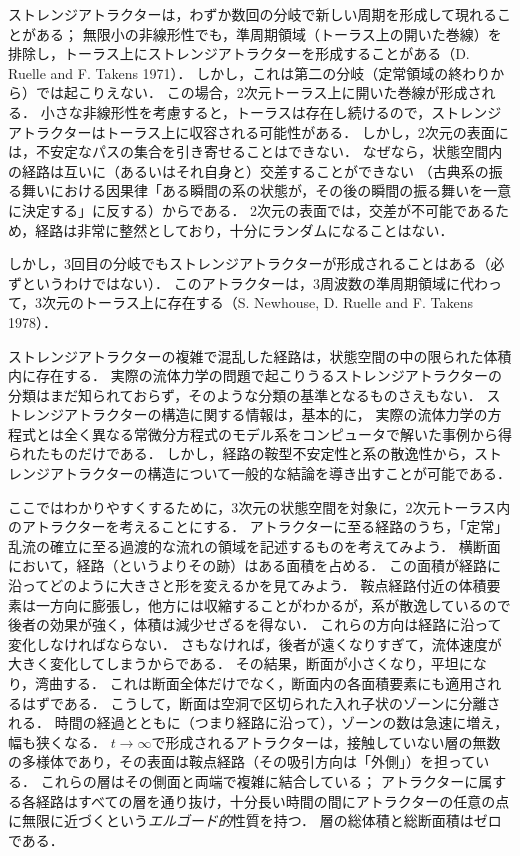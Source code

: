 ストレンジアトラクターは，わずか数回の分岐で新しい周期を形成して現れることがある；
無限小の非線形性でも，準周期領域（トーラス上の開いた巻線）を排除し，トーラス上にストレンジアトラクターを形成することがある（D. Ruelle and F. Takens 1971）．
しかし，これは第二の分岐（定常領域の終わりから）では起こりえない．
この場合，2次元トーラス上に開いた巻線が形成される．
小さな非線形性を考慮すると，トーラスは存在し続けるので，ストレンジアトラクターはトーラス上に収容される可能性がある．%
しかし，2次元の表面には，不安定なパスの集合を引き寄せることはできない．
なぜなら，状態空間内の経路は互いに（あるいはそれ自身と）交差することができない
（古典系の振る舞いにおける因果律「ある瞬間の系の状態が，その後の瞬間の振る舞いを一意に決定する」に反する）からである．
2次元の表面では，交差が不可能であるため，経路は非常に整然としており，十分にランダムになることはない．



しかし，3回目の分岐でもストレンジアトラクターが形成されることはある（必ずというわけではない）．
このアトラクターは，3周波数の準周期領域に代わって，3次元のトーラス上に存在する（S. Newhouse, D. Ruelle and F. Takens 1978）．



ストレンジアトラクターの複雑で混乱した経路は，状態空間の中の限られた体積内に存在する．
実際の流体力学の問題で起こりうるストレンジアトラクターの分類はまだ知られておらず，そのような分類の基準となるものさえもない．
ストレンジアトラクターの構造に関する情報は，基本的に，
実際の流体力学の方程式とは全く異なる常微分方程式のモデル系をコンピュータで解いた事例から得られたものだけである．
しかし，経路の鞍型不安定性と系の散逸性から，ストレンジアトラクターの構造について一般的な結論を導き出すことが可能である．




ここではわかりやすくするために，3次元の状態空間を対象に，2次元トーラス内のアトラクターを考えることにする．
アトラクターに至る経路のうち，「定常」乱流の確立に至る過渡的な流れの領域を記述するものを考えてみよう．
横断面において，経路（というよりその跡）はある面積を占める．
この面積が経路に沿ってどのように大きさと形を変えるかを見てみよう．
鞍点経路付近の体積要素は一方向に膨張し，他方には収縮することがわかるが，系が散逸しているので後者の効果が強く，体積は減少せざるを得ない．
これらの方向は経路に沿って変化しなければならない．
さもなければ，後者が遠くなりすぎて，流体速度が大きく変化してしまうからである．
その結果，断面が小さくなり，平坦になり，湾曲する．
これは断面全体だけでなく，断面内の各面積要素にも適用されるはずである．
こうして，断面は空洞で区切られた入れ子状のゾーンに分離される．
時間の経過とともに（つまり経路に沿って），ゾーンの数は急速に増え，幅も狭くなる．
$t\to\infty$で形成されるアトラクターは，接触していない層の無数の多様体であり，その表面は鞍点経路（その吸引方向は「外側」）を担っている．
これらの層はその側面と両端で複雑に結合している；
アトラクターに属する各経路はすべての層を通り抜け，十分長い時間の間にアトラクターの任意の点に無限に近づくという\emph{エルゴード的}性質を持つ．
層の総体積と総断面積はゼロである．



